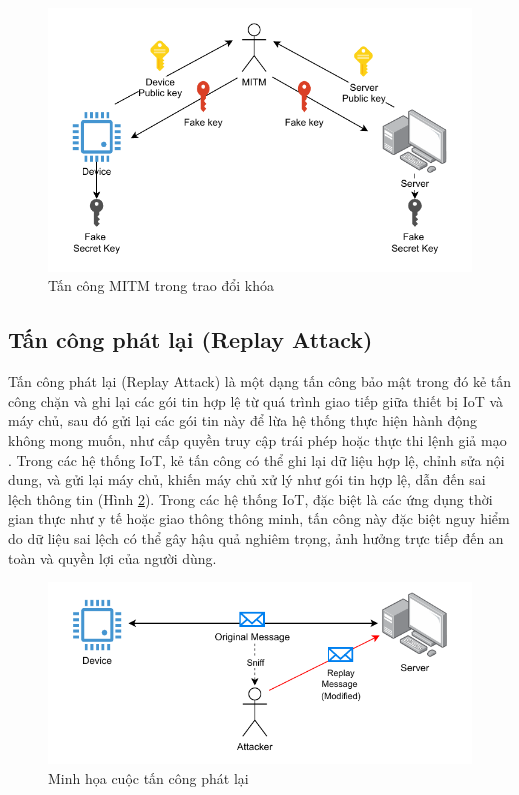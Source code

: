 \begin{figure}[h]
    \centering
    \includegraphics[width=0.7\linewidth]{images/MITM1.pdf}
    \caption{Tấn công MITM trong trao đổi khóa}
    \label{fig:mitm2}
\end{figure}

\subsection{Tấn công phát lại (Replay Attack)}
Tấn công phát lại (Replay Attack) là một dạng tấn công bảo mật trong đó kẻ tấn công chặn và ghi lại các gói tin hợp lệ từ quá trình giao tiếp giữa thiết bị IoT và máy chủ, sau đó gửi lại các gói tin này để lừa hệ thống thực hiện hành động không mong muốn, như cấp quyền truy cập trái phép hoặc thực thi lệnh giả mạo \cite{replay-attack}. Trong các hệ thống IoT, kẻ tấn công có thể ghi lại dữ liệu hợp lệ, chỉnh sửa nội dung, và gửi lại máy chủ, khiến máy chủ xử lý như gói tin hợp lệ, dẫn đến sai lệch thông tin (Hình \ref{fig:replay}). Trong các hệ thống IoT, đặc biệt là các ứng dụng thời gian thực như y tế hoặc giao thông thông minh, tấn công này đặc biệt nguy hiểm do dữ liệu sai lệch có thể gây hậu quả nghiêm trọng, ảnh hưởng trực tiếp đến an toàn và quyền lợi của người dùng.
\begin{figure}[h]
    \centering
    \includegraphics[width=0.7\linewidth]{images/replay.pdf}
    \caption{Minh họa cuộc tấn công phát lại}
    \label{fig:replay}
\end{figure}


